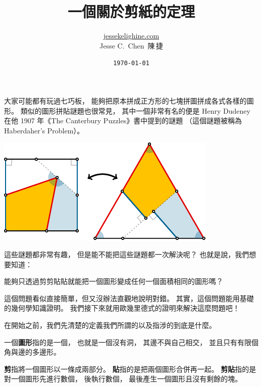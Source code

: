 \documentclass{article}
\title{一個關於剪紙的定理}
\author{\href{https://jessekelighine.com}{jessekelighine.com}\\Jesse C.\ Chen\ 陳\,捷}
\date{\texttt{\today}}
\begin{document}
\begin{multicols}{2}

\begin{spacing}{1}
	\maketitle\thispagestyle{fancy}
\end{spacing}

\noindent
大家可能都有玩過七巧板，
能夠把原本拼成正方形的七塊拼圖拼成各式各樣的圖形。
類似的圖形拼貼謎題也很常見，
其中一個非常有名的便是 Henry Dudeney 在他 1907 年《The Canterbury Puzzles》書中提到的謎題
（這個謎題被稱為 Haberdaher's Problem）。
\begin{center}
	\includegraphics[scale=1]{figures/figure-example.pdf}
\end{center}
這些謎題都非常有趣，
但是能不能把這些謎題都一次解決呢？
也就是說，我們想要知道：
\begin{question*}
	能夠只透過剪剪貼貼就能把一個圖形變成任何一個面積相同的圖形嗎？
\end{question*}

\noindent
這個問題看似直接簡單，但又沒辦法直觀地說明對錯。
其實，這個問題能用基礎的幾何學知識證明。
我們接下來就用歐幾里德式的證明來解決這麼問題吧！

\dinkus

\noindent
在開始之前，我們先清楚的定義我們所謂的以及指涉的到底是什麼。

\begin{definition}[圖形]
	一個\textbf{圖形}指的是一個，
	也就是一個沒有洞，
	其邊不與自己相交，
	並且只有有限個角與邊的多邊形。
\end{definition}

\begin{definition}[剪貼]
	\textbf{剪}指將一個圖形以一條成兩部分。
	\textbf{貼}指的是把兩個圖形合併再一起。
	\textbf{剪貼}指的是對一個圖形先進行數個，
	後執行數個，
	最後產生一個圖形且沒有剩餘的塊。
\end{definition}


\end{multicols}
\end{document}
